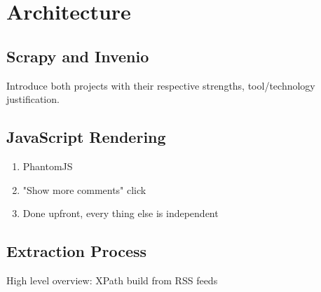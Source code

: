 \section{Architecture}

\subsection{Scrapy and Invenio}
Introduce both projects with their respective strengths, tool/technology justification.

\subsection{JavaScript Rendering}
\begin{enumerate}
  \item PhantomJS
  \item "Show more comments" click
  \item Done upfront, every thing else is independent
\end{enumerate}

\subsection{Extraction Process}
High level overview: XPath build from RSS feeds

